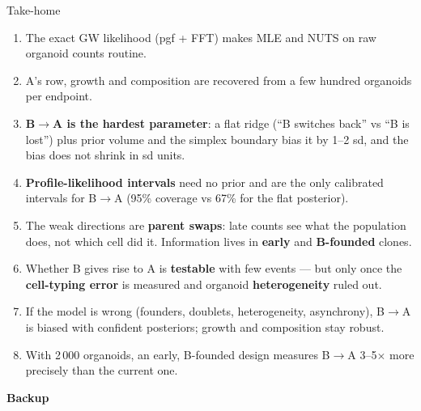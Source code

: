 \documentclass[aspectratio=169,11pt]{beamer}
\newcommand{\BA}{B$\to$A}
\begin{document}
\begin{frame}{Take-home}
\begin{enumerate}\small
\item The exact GW likelihood (pgf + FFT) makes MLE and NUTS on raw organoid counts routine.
\item A's row, growth and composition are recovered from a few hundred organoids per endpoint.
\item \textbf{B$\to$A is the hardest parameter}: a flat ridge (``B switches back'' vs ``B is lost'') plus prior volume and the simplex boundary bias it by 1--2 sd, and the bias does not shrink in sd units.
\item \textbf{Profile-likelihood intervals} need no prior and are the only calibrated intervals for \BA{} (95\% coverage vs 67\% for the flat posterior).
\item The weak directions are \textbf{parent swaps}: late counts see what the population does, not which cell did it. Information lives in \textbf{early} and \textbf{B-founded} clones.
\item Whether B gives rise to A is \textbf{testable} with few events --- but only once the \textbf{cell-typing error} is measured and organoid \textbf{heterogeneity} ruled out.
\item If the model is wrong (founders, doublets, heterogeneity, asynchrony), \BA{} is biased with confident posteriors; growth and composition stay robust.
\item With 2\,000 organoids, an early, B-founded design measures \BA{} 3--5$\times$ more precisely than the current one.
\end{enumerate}
\end{frame}

\appendix
\begin{frame}
\centering\vfill{\huge\bfseries Backup}\vfill
\end{frame}
\end{document}
